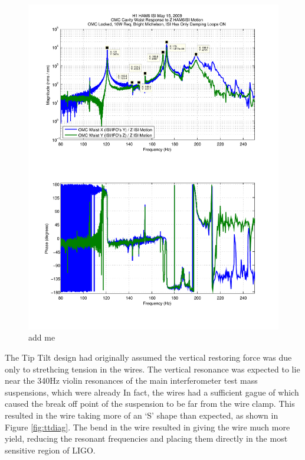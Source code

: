 \begin{figure}
  \begin{center}
  \leavevmode
  \includegraphics[width=\textwidth]{figs-jitter/TTbounceTF.pdf}
  \end{center}
  \caption[add me]{add me}
  \label{fig:TTbounceTF}
\end{figure}

The Tip Tilt design had originally assumed the vertical restoring force was due only to strethcing tension in the wires. %
The vertical resonance was expected to lie near the 340Hz violin resonances of the main interferometer test mass suspensions, which were already In fact, the wires had a sufficient gague of  which caused the break off point of the suspension to be far from the wire clamp. %
This resulted in the wire taking more of an `S' shape than expected, as shown in Figure \ref{fig:ttdiag}. %
The bend in the wire resulted in giving the wire much more yield, reducing the resonant frequencies and placing them directly in the most sensitive region of LIGO. %

